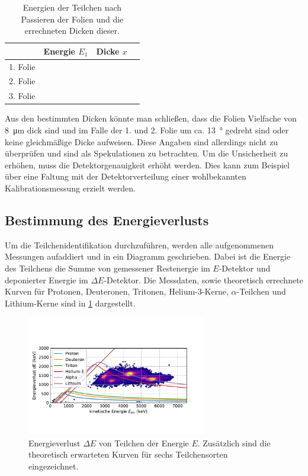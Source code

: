 \begin{table}[ht]
	\centering
	\caption{Energien der Teilchen nach Passieren der Folien und die errechneten Dicken dieser.} 
	\label{tab:dicken}
	\begin{tabular}{c|ccc}
		\toprule
		         &          Energie $E_1$          &           Dicke $x$           &  \\ \midrule
		1. Folie &  &  &  \\
		2. Folie &  &  &  \\
		3. Folie &  &  &  \\ \bottomrule
	\end{tabular}
\end{table}

Aus den bestimmten Dicken könnte man schließen, dass die Folien Vielfache von \SI{8}{\micro\meter} dick sind und im Falle der 1. und 2. Folie um ca. \SI{13}{\degree} gedreht sind oder keine gleichmäßige Dicke aufweisen.
Diese Angaben sind allerdings nicht zu überprüfen und sind als Spekulationen zu betrachten.
Um die Unsicherheit zu erhöhen, muss die Detektorgenauigkeit erhöht werden.
Dies kann zum Beispiel über eine Faltung mit der Detektorverteilung einer wohlbekannten Kalibrationsmessung erzielt werden.

\subsection{Bestimmung des Energieverlusts}

Um die Teilchenidentifikation durchzuführen, werden alle aufgenommenen Messungen aufaddiert und in ein Diagramm geschrieben.
Dabei ist die Energie des Teilchens die Summe von gemessener Restenergie im $E$-Detektor und deponierter Energie im $\Delta E$-Detektor.
Die Messdaten, sowie theoretisch errechnete Kurven für Protonen, Deuteronen, Tritonen, Helium-3-Kerne, $\alpha$-Teilchen und Lithium-Kerne sind in \cref{fig:energieverlust} dargestellt.

\begin{figure}[ht]
	\centering
	\includegraphics[width=0.7\textwidth]{dat/energieverlust.pdf}
	\caption{Energieverlust $\Delta E$ von Teilchen der Energie $E$. Zusätzlich sind die theoretisch erwarteten Kurven für sechs Teilchensorten eingezeichnet.}
	\label{fig:energieverlust}
\end{figure}

